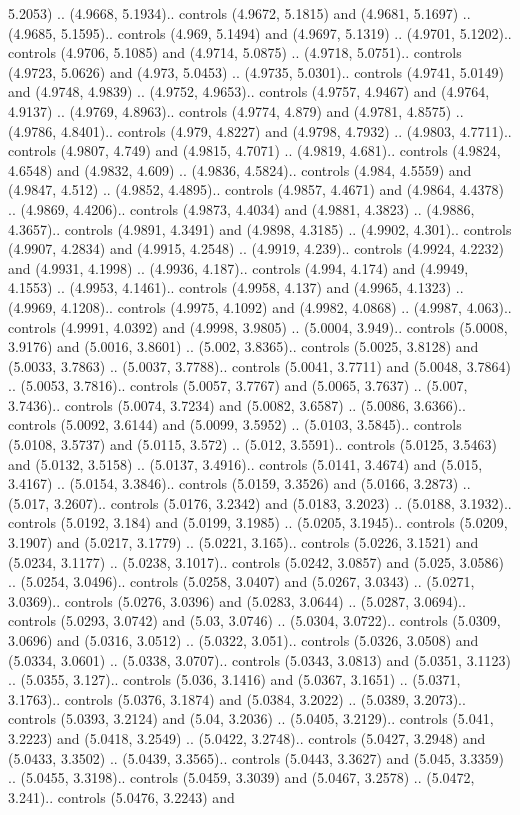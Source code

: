 5.2053) .. (4.9668, 5.1934).. controls (4.9672, 5.1815) and (4.9681, 5.1697) .. (4.9685, 5.1595).. controls (4.969, 5.1494) and (4.9697, 5.1319) .. (4.9701, 5.1202).. controls (4.9706, 5.1085) and (4.9714, 5.0875) .. (4.9718, 5.0751).. controls (4.9723, 5.0626) and (4.973, 5.0453) .. (4.9735, 5.0301).. controls (4.9741, 5.0149) and (4.9748, 4.9839) .. (4.9752, 4.9653).. controls (4.9757, 4.9467) and (4.9764, 4.9137) .. (4.9769, 4.8963).. controls (4.9774, 4.879) and (4.9781, 4.8575) .. (4.9786, 4.8401).. controls (4.979, 4.8227) and (4.9798, 4.7932) .. (4.9803, 4.7711).. controls (4.9807, 4.749) and (4.9815, 4.7071) .. (4.9819, 4.681).. controls (4.9824, 4.6548) and (4.9832, 4.609) .. (4.9836, 4.5824).. controls (4.984, 4.5559) and (4.9847, 4.512) .. (4.9852, 4.4895).. controls (4.9857, 4.4671) and (4.9864, 4.4378) .. (4.9869, 4.4206).. controls (4.9873, 4.4034) and (4.9881, 4.3823) .. (4.9886, 4.3657).. controls (4.9891, 4.3491) and (4.9898, 4.3185) .. (4.9902, 4.301).. controls (4.9907, 4.2834) and (4.9915, 4.2548) .. (4.9919, 4.239).. controls (4.9924, 4.2232) and (4.9931, 4.1998) .. (4.9936, 4.187).. controls (4.994, 4.174) and (4.9949, 4.1553) .. (4.9953, 4.1461).. controls (4.9958, 4.137) and (4.9965, 4.1323) .. (4.9969, 4.1208).. controls (4.9975, 4.1092) and (4.9982, 4.0868) .. (4.9987, 4.063).. controls (4.9991, 4.0392) and (4.9998, 3.9805) .. (5.0004, 3.949).. controls (5.0008, 3.9176) and (5.0016, 3.8601) .. (5.002, 3.8365).. controls (5.0025, 3.8128) and (5.0033, 3.7863) .. (5.0037, 3.7788).. controls (5.0041, 3.7711) and (5.0048, 3.7864) .. (5.0053, 3.7816).. controls (5.0057, 3.7767) and (5.0065, 3.7637) .. (5.007, 3.7436).. controls (5.0074, 3.7234) and (5.0082, 3.6587) .. (5.0086, 3.6366).. controls (5.0092, 3.6144) and (5.0099, 3.5952) .. (5.0103, 3.5845).. controls (5.0108, 3.5737) and (5.0115, 3.572) .. (5.012, 3.5591).. controls (5.0125, 3.5463) and (5.0132, 3.5158) .. (5.0137, 3.4916).. controls (5.0141, 3.4674) and (5.015, 3.4167) .. (5.0154, 3.3846).. controls (5.0159, 3.3526) and (5.0166, 3.2873) .. (5.017, 3.2607).. controls (5.0176, 3.2342) and (5.0183, 3.2023) .. (5.0188, 3.1932).. controls (5.0192, 3.184) and (5.0199, 3.1985) .. (5.0205, 3.1945).. controls (5.0209, 3.1907) and (5.0217, 3.1779) .. (5.0221, 3.165).. controls (5.0226, 3.1521) and (5.0234, 3.1177) .. (5.0238, 3.1017).. controls (5.0242, 3.0857) and (5.025, 3.0586) .. (5.0254, 3.0496).. controls (5.0258, 3.0407) and (5.0267, 3.0343) .. (5.0271, 3.0369).. controls (5.0276, 3.0396) and (5.0283, 3.0644) .. (5.0287, 3.0694).. controls (5.0293, 3.0742) and (5.03, 3.0746) .. (5.0304, 3.0722).. controls (5.0309, 3.0696) and (5.0316, 3.0512) .. (5.0322, 3.051).. controls (5.0326, 3.0508) and (5.0334, 3.0601) .. (5.0338, 3.0707).. controls (5.0343, 3.0813) and (5.0351, 3.1123) .. (5.0355, 3.127).. controls (5.036, 3.1416) and (5.0367, 3.1651) .. (5.0371, 3.1763).. controls (5.0376, 3.1874) and (5.0384, 3.2022) .. (5.0389, 3.2073).. controls (5.0393, 3.2124) and (5.04, 3.2036) .. (5.0405, 3.2129).. controls (5.041, 3.2223) and (5.0418, 3.2549) .. (5.0422, 3.2748).. controls (5.0427, 3.2948) and (5.0433, 3.3502) .. (5.0439, 3.3565).. controls (5.0443, 3.3627) and (5.045, 3.3359) .. (5.0455, 3.3198).. controls (5.0459, 3.3039) and (5.0467, 3.2578) .. (5.0472, 3.241).. controls (5.0476, 3.2243) and 